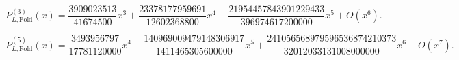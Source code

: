 \begin{equation}
P_{L,\mathrm{Fold}}^{(3)}(x)=\frac{3909023513}{41674500}x^{3}+\frac{23378177959691}{12602368800}x^{4}+\frac{21954457843901229433}{396974617200000}x^{5}+O(x^{6}).
\end{equation}

\begin{equation}
P_{L,\mathrm{Fold}}^{(5)}(x)=\frac{3493956797}{17781120000}x^{4}+\frac{140969009479148306917}{1411465305600000}x^{5}+\frac{241056568979596536874210373}{32012033131008000000}x^{6}+O(x^{7}).
\end{equation}
